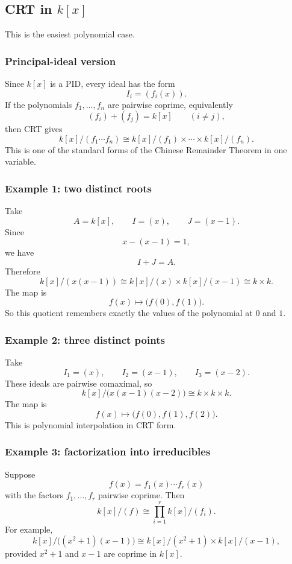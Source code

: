 \documentclass[12pt,a4paper]{article}
\theoremstyle{notespace}
\begin{document}
\subsection{CRT in \(k[x]\)}

This is the easiest polynomial case.

\subsubsection{Principal-ideal version}

Since \(k[x]\) is a PID, every ideal has the form
\[
I_i=(f_i(x)).
\]
If the polynomials \(f_1,\dots,f_n\) are pairwise coprime, equivalently
\[
(f_i)+(f_j)=k[x] \qquad (i\neq j),
\]
then CRT gives
\[
k[x]/(f_1\cdots f_n)\cong k[x]/(f_1)\times \cdots \times k[x]/(f_n).
\]
This is one of the standard forms of the Chinese Remainder Theorem in one variable.

\subsubsection{Example 1: two distinct roots}

Take
\[
A=k[x], \qquad I=(x), \qquad J=(x-1).
\]
Since
\[
x-(x-1)=1,
\]
we have
\[
I+J=A.
\]
Therefore
\[
k[x]/(x(x-1))
\cong
k[x]/(x)\times k[x]/(x-1)
\cong
k\times k.
\]
The map is
\[
f(x)\longmapsto \bigl(f(0),f(1)\bigr).
\]
So this quotient remembers exactly the values of the polynomial at \(0\) and \(1\).

\subsubsection{Example 2: three distinct points}

Take
\[
I_1=(x),\qquad I_2=(x-1),\qquad I_3=(x-2).
\]
These ideals are pairwise comaximal, so
\[
k[x]/\bigl(x(x-1)(x-2)\bigr)\cong k\times k\times k.
\]
The map is
\[
f(x)\longmapsto \bigl(f(0),f(1),f(2)\bigr).
\]
This is polynomial interpolation in CRT form.

\subsubsection{Example 3: factorization into irreducibles}

Suppose
\[
f(x)=f_1(x)\cdots f_r(x)
\]
with the factors \(f_1,\dots,f_r\) pairwise coprime.
Then
\[
k[x]/(f)\cong \prod_{i=1}^r k[x]/(f_i).
\]
For example,
\[
k[x]/\bigl((x^2+1)(x-1)\bigr)
\cong
k[x]/(x^2+1)\times k[x]/(x-1),
\]
provided \(x^2+1\) and \(x-1\) are coprime in \(k[x]\).
\end{document}
